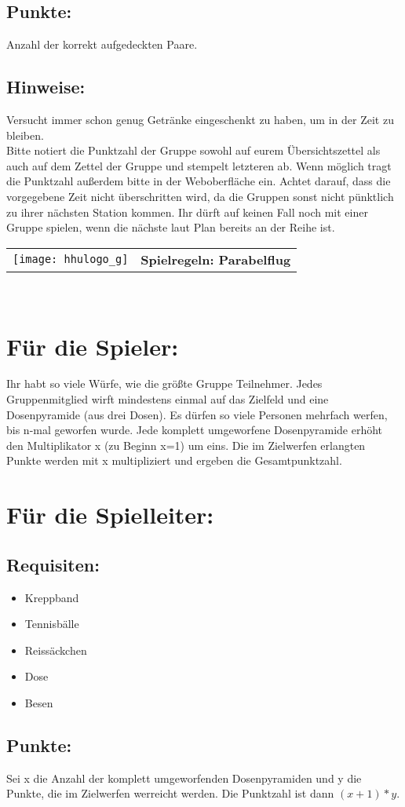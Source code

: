\documentclass[a4paper,10pt]{article}
\def\spielh{Parabelflug}
\newcommand{\unten}{
 Bitte notiert die Punktzahl der Gruppe sowohl auf eurem Übersichtszettel als auch auf dem Zettel der Gruppe und stempelt letzteren ab. Wenn möglich tragt die Punktzahl außerdem bitte in der Weboberfläche ein.
 Achtet darauf, dass die vorgegebene Zeit nicht überschritten wird, da die Gruppen sonst nicht pünktlich zu ihrer nächsten Station kommen. Ihr dürft auf keinen Fall noch mit einer Gruppe spielen, wenn die nächste laut Plan bereits an der Reihe ist.
}
\begin{document}
\subsection*{Punkte:}
Anzahl der korrekt aufgedeckten Paare.
\subsection*{Hinweise:}
Versucht immer schon genug Getränke eingeschenkt zu haben, um in der Zeit zu bleiben.\\
\unten

\newpage


  \begin{tabularx}{\textwidth}{lc}
    \texttt{[image: hhulogo\_g]}
  & {\Huge \textbf{Spielregeln: \spielh}}
  \end{tabularx}\\


\Large
\section*{Für die Spieler:}
Ihr habt so viele Würfe, wie die größte Gruppe Teilnehmer. Jedes Gruppenmitglied wirft mindestens einmal auf das Zielfeld und eine Dosenpyramide (aus drei Dosen). Es dürfen so viele Personen mehrfach werfen, bis n-mal geworfen wurde. Jede komplett umgeworfene Dosenpyramide erhöht den Multiplikator x (zu Beginn x=1) um eins.  Die im Zielwerfen erlangten Punkte werden mit x multipliziert und ergeben die Gesamtpunktzahl.


\section*{Für die Spielleiter:}
\subsection*{Requisiten:} 
\begin{itemize}
 \item Kreppband
 \item Tennisbälle
 \item Reissäckchen
 \item Dose
 \item Besen
\end{itemize}

\subsection*{Punkte:}
Sei x die Anzahl der komplett umgeworfenden Dosenpyramiden und y die Punkte, die im Zielwerfen werreicht werden. Die Punktzahl ist dann $(x+1)*y$. 
\end{document}
